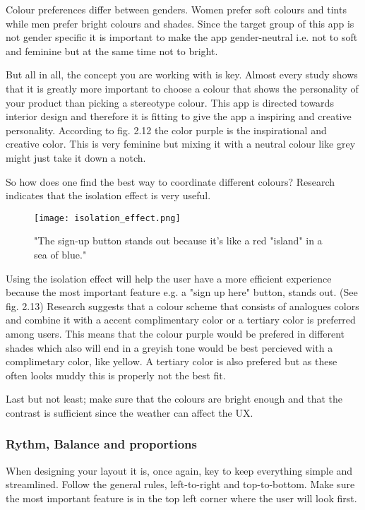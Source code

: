 Colour preferences differ between genders. Women prefer soft colours and tints while men prefer bright colours and shades. \cite{ColorMeaning} Since the target group of this app is not gender specific it is important to make the app gender-neutral i.e. not to soft and feminine but at the same time not to bright. 

But all in all, the concept you are working with is key. Almost every study shows that it is greatly more important to choose a colour that shows the personality of your product than picking a stereotype colour. \cite{ColorMeaning} This app is directed towards interior design and therefore it is fitting to give the app a inspiring and creative personality. According to fig. 2.12 the color purple is the inspirational and creative color. This is very feminine but mixing it with a neutral colour like grey might just take it down a notch. 

So how does one find the best way to coordinate different colours? Research indicates that the isolation effect is very useful.

\begin{figure}[H]
\centering
\texttt{[image: isolation\_effect.png]}
\caption{"The sign-up button stands out because it's like a red "island" in a sea of blue." \cite{ColorMeaning}}
\end{figure}

Using the isolation effect will help the user have a more efficient experience because the most important feature e.g. a "sign up here" button, stands out. \cite{ColorMeaning} (See fig. 2.13)
Research suggests that a colour scheme that consists of analogues colors and combine it with a accent complimentary color or a tertiary color is preferred among users. \cite{ColorMeaning} 
This means that the colour purple would be prefered in different shades which also will end in a greyish tone would be best percieved with a complimetary color, like yellow. A tertiary color is also prefered but as these often looks muddy this is properly not the best fit.

Last but not least; make sure that the colours are bright enough and that the contrast is sufficient since the weather can affect the UX. \cite{Graphic}

\subsubsection{Rythm, Balance and proportions}
When designing your layout it is, once again, key to keep everything simple and streamlined. 
Follow the general rules, left-to-right and top-to-bottom. Make sure the most important feature is in the top left corner where the user will look first.\cite{Graphic}

